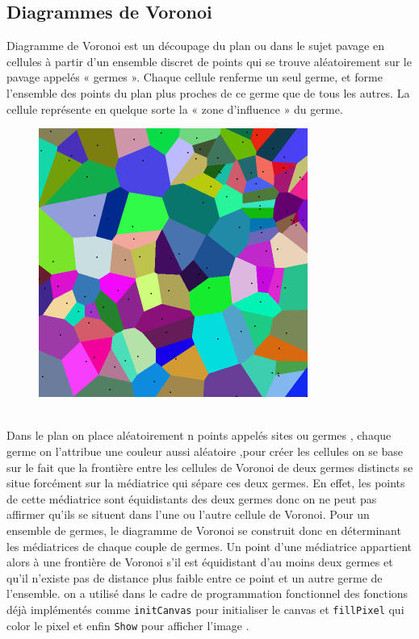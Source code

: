 \documentclass[a4paper,10pt]{article}
\begin{document}
\subsection{Diagrammes de Voronoi}
Diagramme de Voronoi est un découpage du plan ou dans le sujet pavage en cellules à partir d'un ensemble discret de points qui se trouve aléatoirement sur le pavage appelés « germes ». Chaque cellule renferme un seul germe, et forme l'ensemble des points du plan plus proches de ce germe que de tous les autres. La cellule représente en quelque sorte la « zone d'influence » du germe.\\
\begin{figure}[h]
    \centering
    \includegraphics[scale=0.5]{Coloured_Voronoi_2D.png}
\end{figure}\\
Dans le plan on place aléatoirement n points appelés sites ou  germes , chaque germe on l'attribue une couleur aussi aléatoire ,pour créer les cellules on se base sur le fait que la frontière entre les cellules de Voronoi de deux germes distincts se situe forcément sur la médiatrice qui sépare ces deux germes. En effet, les points de cette médiatrice sont équidistants des deux germes donc on ne peut pas affirmer qu’ils se situent dans l'une ou l'autre cellule de Voronoi. Pour un ensemble de germes, le diagramme de Voronoi se construit donc en déterminant les médiatrices de chaque couple de germes. Un point d'une médiatrice appartient alors à une frontière de Voronoi s'il est équidistant d'au moins deux germes et qu'il n'existe pas de distance plus faible entre ce point et un autre germe de l'ensemble. 
on a utilisé dans le cadre de programmation fonctionnel des fonctions déjà implémentés 
comme \texttt{initCanvas} pour initialiser le canvas et \texttt{fillPixel} qui color le pixel et enfin \texttt{Show} pour afficher l'image .
\end{document}
